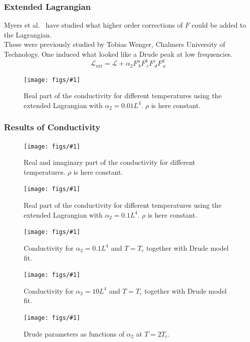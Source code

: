 \documentclass{beamer}
\newcommand{\fig}[2]{
\begin{figure}
\centering
\texttt{[image: figs/\#1]}
\caption{#2}
\end{figure}
}
\begin{document}
\begin{frame}
\frametitle{Extended Lagrangian}
Myers et al.~\cite{Myers:2010pk} have studied what higher order corrections of $F$ could be added to the Lagrangian.\\
These were previously studied by Tobias Wenger, Chalmers University of Technology.
One induced what looked like a Drude peak at low frequencies.
\begin{equation}
 \mathcal{L}_\mathrm{ext}=\mathcal{L}+\alpha_2F^a_{\ b}F^b_{\ c}F^c_{\ d}F^d_{\ a}
\end{equation}
\end{frame}

\begin{frame}
\fig{cond_Ts_a2_0.01_v2.pdf}{Real part of the conductivity for different temperatures using the extended Lagrangian with $\alpha_2=0.01L^4$. $\rho$ is here constant.\label{f:cond_a2_1}}
\end{frame}

\begin{frame}
\frametitle{Results of Conductivity}
\fig{cond_Ts_a2_0.0_v2.pdf}{Real and imaginary part of the conductivity for different temperatures. $\rho$ is here constant.\label{f:cond}}
\end{frame}

\begin{frame}
\fig{cond_Ts_a2_0.1_v2.pdf}{Real part of the conductivity for different temperatures using the extended Lagrangian with $\alpha_2=0.1L^4$. $\rho$ is here constant.\label{f:cond_a2_2}}
\end{frame}

\begin{frame}
\fig{drude_T_1Tc_a2_0.1}{Conductivity for $\alpha_2=0.1L^4$ and $T=T_c$ together with Drude model fit.\label{f:drude}}
\end{frame}

\begin{frame}
\fig{drude_T_1Tc_a2_10}{Conductivity for $\alpha_2=10L^4$ and $T=T_c$ together with Drude model fit.\label{f:drude2}}
\end{frame}

\begin{frame}
\fig{drudeVara2_T=2Tc}{Drude parameters as functions of $\alpha_2$ at $T=2T_c$.\label{f:drudeVar}}
\end{frame}
\end{document}
